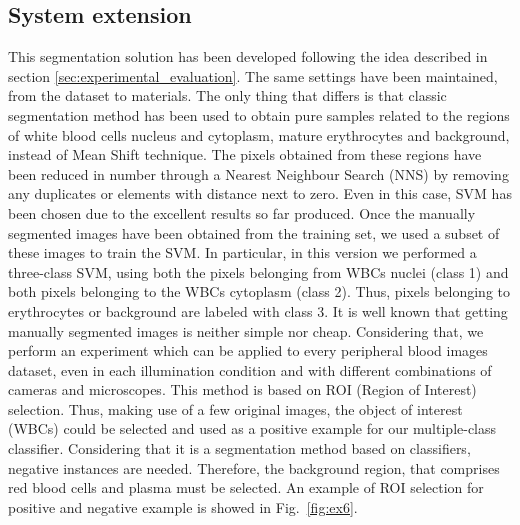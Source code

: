{	\subsection{System extension} \label{caip2015}  %
	This segmentation solution has been developed following the idea described in section \ref{sec:experimental_evaluation}.
	The same settings have been maintained, from the dataset to materials. The only thing that differs is that classic segmentation method has been used to obtain pure samples related to the regions of white blood cells nucleus and cytoplasm, mature erythrocytes and background, instead of Mean Shift technique. The pixels obtained from these regions have been reduced in number through a Nearest Neighbour Search (NNS) by removing any duplicates or elements with distance next to zero. Even in this case, SVM has been chosen due to the excellent results so far produced. Once the manually segmented images have been obtained from the training set, we used a subset of these images to train the SVM. In particular, in this version we performed a three-class SVM, using both the pixels belonging from WBCs nuclei (class 1) and both pixels belonging to the WBCs cytoplasm (class 2). Thus, pixels belonging to erythrocytes or background are labeled with class 3. 
	It is well known that getting manually segmented images is neither simple nor cheap. Considering that, we perform an experiment which can be applied to every peripheral blood images dataset, even in each illumination condition and with different combinations of cameras and microscopes. 
	This method is based on ROI (Region of Interest) selection. Thus, making use of a few original images, the object of interest (WBCs) could be selected and used as a positive example for our multiple-class classifier. Considering that it is a segmentation method based on classifiers, negative instances are needed. Therefore, the background region, that comprises red blood cells and plasma must be selected. An example of ROI selection for positive and negative example is showed in Fig.~\ref{fig:ex6}.
	
}
